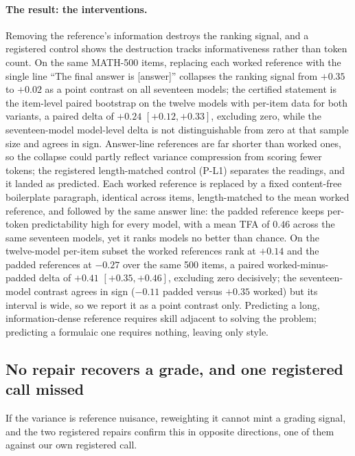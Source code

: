 \documentclass[11pt]{article}
\newcommand{\tfa}{\textsc{TFA}}
\begin{document}
\paragraph{The result: the interventions.}
Removing the reference's information destroys the ranking signal, and a registered control shows the destruction tracks informativeness rather than token count.
On the same \textsc{MATH-500} items, replacing each worked reference with the single line ``The final answer is [answer]'' collapses the ranking signal from $+0.35$ to $+0.02$ as a point contrast on all seventeen models; the certified statement is the item-level paired bootstrap on the twelve models with per-item data for both variants, a paired delta of $+0.24$ $[+0.12, +0.33]$, excluding zero, while the seventeen-model model-level delta is not distinguishable from zero at that sample size and agrees in sign.
Answer-line references are far shorter than worked ones, so the collapse could partly reflect variance compression from scoring fewer tokens; the registered length-matched control (P-L1) separates the readings, and it landed as predicted.
Each worked reference is replaced by a fixed content-free boilerplate paragraph, identical across items, length-matched to the mean worked reference, and followed by the same answer line: the padded reference keeps per-token predictability high for every model, with a mean \tfa{} of $0.46$ across the same seventeen models, yet it ranks models no better than chance.
On the twelve-model per-item subset the worked references rank at $+0.14$ and the padded references at $-0.27$ over the same 500 items, a paired worked-minus-padded delta of $+0.41$ $[+0.35, +0.46]$, excluding zero decisively; the seventeen-model contrast agrees in sign ($-0.11$ padded versus $+0.35$ worked) but its interval is wide, so we report it as a point contrast only.
Predicting a long, information-dense reference requires skill adjacent to solving the problem; predicting a formulaic one requires nothing, leaving only style.

\subsection{No repair recovers a grade, and one registered call missed}
\label{sec:repairs}

If the variance is reference nuisance, reweighting it cannot mint a grading signal, and the two registered repairs confirm this in opposite directions, one of them against our own registered call.
\end{document}
